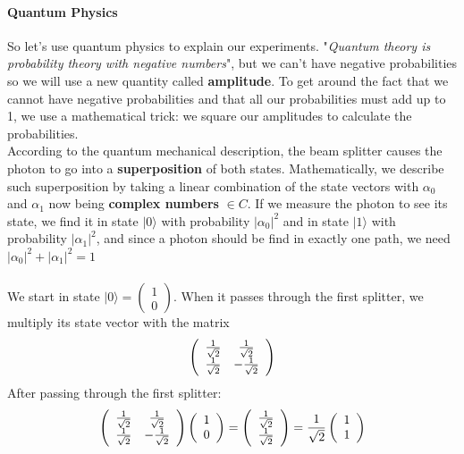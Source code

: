 \documentclass[10pt]{report}
\begin{document}
\paragraph{Quantum Physics} So let's use quantum physics to explain our experiments. "\textit{Quantum theory is probability theory with negative numbers}", but we can't have negative probabilities so we will use a new quantity called \textbf{amplitude}. To get around the fact that we cannot have negative probabilities and that all our probabilities must add up to 1, we use a mathematical trick: we square our amplitudes to calculate the probabilities.\\
According to the quantum mechanical description, the beam splitter causes the photon to go into a \textbf{superposition} of both states. Mathematically, we describe such superposition by taking a linear combination of the state vectors with $\alpha_0$ and $\alpha_1$ now being \textbf{complex numbers} $\in C$. If we measure the photon to see its state, we find it in state $|0\rangle$ with probability $|\alpha_0|^2$ and in state $|1\rangle$ with probability $|\alpha_1|^2$, and since a photon should be find in exactly one path, we need $|\alpha_0|^2+|\alpha_1|^2 = 1$\\\\
We start in state $|0\rangle=\left(\begin{array}{c}1\\0\end{array}\right)$. When it passes through the first splitter, we multiply its state vector with the matrix $$\left(\begin{array}{c c}
\frac{1}{\sqrt{2}}&\frac{1}{\sqrt{2}}\\\frac{1}{\sqrt{2}}&-\frac{1}{\sqrt{2}}
\end{array}\right)$$
After passing through the first splitter:
$$\left(\begin{array}{c c}
\frac{1}{\sqrt{2}}&\frac{1}{\sqrt{2}}\\\frac{1}{\sqrt{2}}&-\frac{1}{\sqrt{2}}
\end{array}\right)\left(\begin{array}{c}
1\\0
\end{array}\right) = \left(\begin{array}{c}
\frac{1}{\sqrt{2}}\\\frac{1}{\sqrt{2}}
\end{array}\right) = \frac{1}{\sqrt{2}}\left(\begin{array}{c}
1\\1
\end{array}\right)$$
\end{document}
